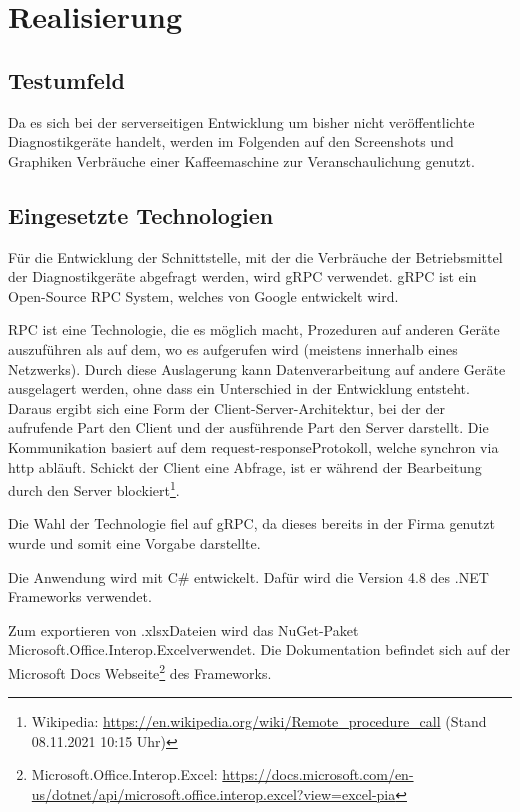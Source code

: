 \section{Realisierung}
\label{sec:Realisierung}

\subsection{Testumfeld}
\label{sec:Testumfeld}
Da es sich bei der serverseitigen Entwicklung um bisher nicht veröffentlichte Diagnostikgeräte handelt, werden im Folgenden auf den Screenshots und Graphiken Verbräuche einer Kaffeemaschine zur Veranschaulichung genutzt.

\subsection{Eingesetzte Technologien}
\label{sec:EingesetzteTechnologien}
Für die Entwicklung der Schnittstelle, mit der die Verbräuche der Betriebsmittel der Diagnostikgeräte abgefragt werden, wird {\acs{gRPC}} verwendet. {\acs{gRPC}} ist ein Open-Source {\acs{RPC}} System, welches von Google entwickelt wird.

{\acs{RPC}} ist eine Technologie, die es möglich macht, Prozeduren auf anderen Geräte auszuführen als auf dem, wo es aufgerufen wird (meistens innerhalb eines Netzwerks). Durch diese Auslagerung kann Datenverarbeitung auf andere Geräte ausgelagert werden, ohne dass ein Unterschied in der Entwicklung entsteht. Daraus ergibt sich eine Form der Client-Server-Architektur, bei der der aufrufende Part den Client und der ausführende Part den Server darstellt. Die Kommunikation basiert auf dem \glqq request-response\grqq \space Protokoll, welche synchron via http abläuft. Schickt der Client eine Abfrage, ist er während der Bearbeitung durch den Server blockiert\footnote{Wikipedia: \url{https://en.wikipedia.org/wiki/Remote_procedure_call} (Stand 08.11.2021 10:15 Uhr)}.

Die Wahl der Technologie fiel auf {\acs{gRPC}}, da dieses bereits in der Firma genutzt wurde und somit eine Vorgabe darstellte.

Die Anwendung wird mit C\# entwickelt. Dafür wird die Version 4.8 des .NET Frameworks verwendet.

Zum exportieren von \glqq .xlsx\grqq \space Dateien wird das {\acs{NuGet}}-Paket \glqq Microsoft.Office.Interop.Excel\grqq \space verwendet. Die Dokumentation befindet sich auf der Microsoft Docs Webseite\footnote{Microsoft.Office.Interop.Excel: \url{https://docs.microsoft.com/en-us/dotnet/api/microsoft.office.interop.excel?view=excel-pia}} des Frameworks.

